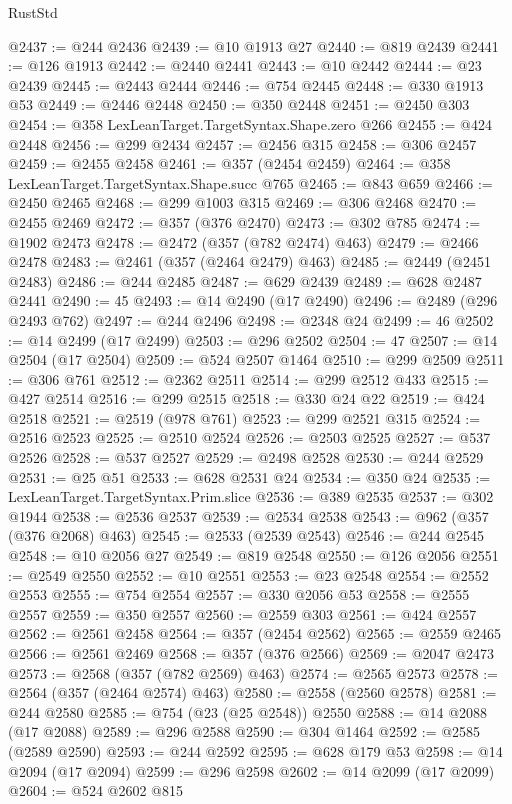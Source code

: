 \begin{lexlean}{RustStd}
\begin{coremodule}
@2437 := @244 @2436
@2439 := @10 @1913 @27
@2440 := @819 @2439
@2441 := @126 @1913
@2442 := @2440 @2441
@2443 := @10 @2442
@2444 := @23 @2439
@2445 := @2443 @2444
@2446 := @754 @2445
@2448 := @330 @1913 @53
@2449 := @2446 @2448
@2450 := @350 @2448
@2451 := @2450 @303
@2454 := @358 LexLeanTarget.TargetSyntax.Shape.zero @266
@2455 := @424 @2448
@2456 := @299 @2434
@2457 := @2456 @315
@2458 := @306 @2457
@2459 := @2455 @2458
@2461 := @357 (@2454 @2459)
@2464 := @358 LexLeanTarget.TargetSyntax.Shape.succ @765
@2465 := @843 @659
@2466 := @2450 @2465
@2468 := @299 @1003 @315
@2469 := @306 @2468
@2470 := @2455 @2469
@2472 := @357 (@376 @2470)
@2473 := @302 @785
@2474 := @1902 @2473
@2478 := @2472 (@357 (@782 @2474) @463)
@2479 := @2466 @2478
@2483 := @2461 (@357 (@2464 @2479) @463)
@2485 := @2449 (@2451 @2483)
@2486 := @244 @2485
@2487 := @629 @2439
@2489 := @628 @2487 @2441
@2490 := 45
@2493 := @14 @2490 (@17 @2490)
@2496 := @2489 (@296 @2493 @762)
@2497 := @244 @2496
@2498 := @2348 @24
@2499 := 46
@2502 := @14 @2499 (@17 @2499)
@2503 := @296 @2502
@2504 := 47
@2507 := @14 @2504 (@17 @2504)
@2509 := @524 @2507 @1464
@2510 := @299 @2509
@2511 := @306 @761
@2512 := @2362 @2511
@2514 := @299 @2512 @433
@2515 := @427 @2514
@2516 := @299 @2515
@2518 := @330 @24 @22
@2519 := @424 @2518
@2521 := @2519 (@978 @761)
@2523 := @299 @2521 @315
@2524 := @2516 @2523
@2525 := @2510 @2524
@2526 := @2503 @2525
@2527 := @537 @2526
@2528 := @537 @2527
@2529 := @2498 @2528
@2530 := @244 @2529
@2531 := @25 @51
@2533 := @628 @2531 @24
@2534 := @350 @24
@2535 := LexLeanTarget.TargetSyntax.Prim.slice
@2536 := @389 @2535
@2537 := @302 @1944
@2538 := @2536 @2537
@2539 := @2534 @2538
@2543 := @962 (@357 (@376 @2068) @463)
@2545 := @2533 (@2539 @2543)
@2546 := @244 @2545
@2548 := @10 @2056 @27
@2549 := @819 @2548
@2550 := @126 @2056
@2551 := @2549 @2550
@2552 := @10 @2551
@2553 := @23 @2548
@2554 := @2552 @2553
@2555 := @754 @2554
@2557 := @330 @2056 @53
@2558 := @2555 @2557
@2559 := @350 @2557
@2560 := @2559 @303
@2561 := @424 @2557
@2562 := @2561 @2458
@2564 := @357 (@2454 @2562)
@2565 := @2559 @2465
@2566 := @2561 @2469
@2568 := @357 (@376 @2566)
@2569 := @2047 @2473
@2573 := @2568 (@357 (@782 @2569) @463)
@2574 := @2565 @2573
@2578 := @2564 (@357 (@2464 @2574) @463)
@2580 := @2558 (@2560 @2578)
@2581 := @244 @2580
@2585 := @754 (@23 (@25 @2548)) @2550
@2588 := @14 @2088 (@17 @2088)
@2589 := @296 @2588
@2590 := @304 @1464
@2592 := @2585 (@2589 @2590)
@2593 := @244 @2592
@2595 := @628 @179 @53
@2598 := @14 @2094 (@17 @2094)
@2599 := @296 @2598
@2602 := @14 @2099 (@17 @2099)
@2604 := @524 @2602 @815

\end{coremodule}
\end{lexlean}

